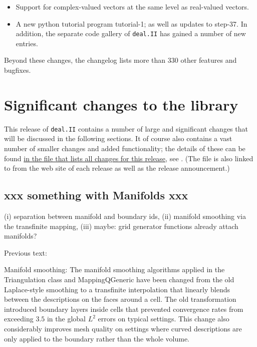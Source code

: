 \documentclass{ansarticle-preprint}
\newcommand{\specialword}[1]{\texttt{#1}}
\newcommand{\dealii}{{\specialword{deal.II}}}
\begin{document}
\begin{itemize}
\item
  Support for complex-valued vectors at the same level as real-valued
  vectors.

\item A new python tutorial program tutorial-1; as well as
  updates to step-37. In addition, the separate code
  gallery of \dealii{} has gained a number of new entries.
\end{itemize}
Beyond these changes, the changelog lists more than 330 other features and bugfixes.




\section{Significant changes to the library}

This release of \dealii{} contains a number of large and significant changes
that will be discussed in the following sections. It of course also contains a
vast number of smaller changes and added functionality; the details of these
can be found
\href{https://www.dealii.org/developer/doxygen/deal.II/changes_between_8_5_and_9_0.html}{
in the file that lists all changes for this release}, see \cite{changes90}.
(The file is also linked to from the web site of each release as well as
the release announcement.)

\subsection{xxx something with Manifolds xxx}


(i) separation between manifold and boundary ids, (ii) manifold
smoothing via the transfinite mapping, (iii) maybe: grid generator functions already attach manifolds?

Previous text:

Manifold smoothing: The manifold smoothing algorithms applied in the
Triangulation class and MappingQGeneric have been changed from the old
Laplace-style smoothing to a transfinite interpolation that linearly
blends between the descriptions on the faces around a cell. The old
transformation introduced boundary layers inside cells that prevented
convergence rates from exceeding \(3.5\) in the global \(L^2\) errors on typical
settings. This change also considerably improves mesh quality on settings
where curved descriptions are only applied to the boundary rather than
the whole volume.
\end{document}
